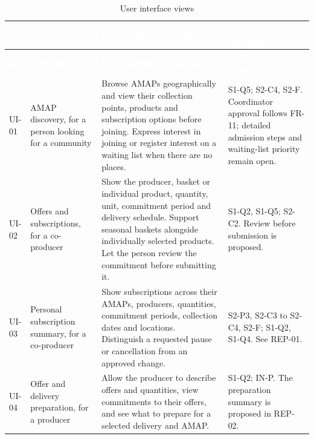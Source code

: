 \documentclass[11pt,a4paper]{article}
\begin{document}
{\footnotesize
\begin{longtable}{>{\raggedright\arraybackslash\hspace{0pt}}p{}>{\raggedright\arraybackslash\hspace{0pt}}p{}>{\raggedright\arraybackslash\hspace{0pt}}p{}>{\raggedright\arraybackslash\hspace{0pt}}p{}}
\caption{User interface views}\\
\rowcolor{hdr}\textcolor{white}{\textbf{ID}} & \textcolor{white}{\textbf{View and user}} & \textcolor{white}{\textbf{Information and actions}} & \textcolor{white}{\textbf{Source or reasoning}} \\ \endfirsthead
\rowcolor{hdr}\textcolor{white}{\textbf{ID}} & \textcolor{white}{\textbf{View and user}} & \textcolor{white}{\textbf{Information and actions}} & \textcolor{white}{\textbf{Source or reasoning}} \\ \endhead
UI-01 & AMAP discovery, for a person looking for a community & Browse AMAPs geographically and view their collection points, products and subscription options before joining. Express interest in joining or register interest on a waiting list when there are no places. & S1-Q5; S2-C4, S2-F. Coordinator approval follows FR-11; detailed admission steps and waiting-list priority remain open. \\ \hline
UI-02 & Offers and subscriptions, for a co-producer & Show the producer, basket or individual product, quantity, unit, commitment period and delivery schedule. Support seasonal baskets alongside individually selected products. Let the person review the commitment before submitting it. & S1-Q2, S1-Q5; S2-C2. Review before submission is proposed. \\ \hline
UI-03 & Personal subscription summary, for a co-producer & Show subscriptions across their AMAPs, producers, quantities, commitment periods, collection dates and locations. Distinguish a requested pause or cancellation from an approved change. & S2-P3, S2-C3 to S2-C4, S2-F; S1-Q2, S1-Q4. See REP-01. \\ \hline
UI-04 & Offer and delivery preparation, for a producer & Allow the producer to describe offers and quantities, view commitments to their offers, and see what to prepare for a selected delivery and AMAP. & S1-Q2; IN-P. The preparation summary is proposed in REP-02. \\ \hline

\end{longtable}}
\end{document}
